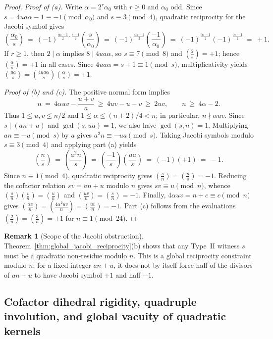 \documentclass[11pt, a4paper]{article}
\theoremstyle{plain}
\theoremstyle{definition}
\newtheorem{remark}[theorem]{Remark}
\newcommand{\leg}[2]{\left(\frac{#1}{#2}\right)}
\begin{document}
\begin{proof}
\emph{Proof of (a).} Write $\alpha=2^{r}\alpha_0$ with $r\ge0$ and $\alpha_0$ odd. Since $s=4ua\alpha-1\equiv-1\pmod{\alpha_0}$ and $s\equiv3\pmod 4$, quadratic reciprocity for the Jacobi symbol gives
$$\leg{\alpha_0}{s}\ =\ (-1)^{\frac{\alpha_0-1}{2}\cdot\frac{s-1}{2}}\leg{s}{\alpha_0}\ =\ (-1)^{\frac{\alpha_0-1}{2}}\leg{-1}{\alpha_0}\ =\ (-1)^{\frac{\alpha_0-1}{2}}(-1)^{\frac{\alpha_0-1}{2}}\ =\ +1.$$
If $r\ge1$, then $2\mid\alpha$ implies $8\mid 4ua\alpha$, so $s\equiv7\pmod 8$ and $\leg{2}{s}=+1$; hence $\leg{\alpha}{s}=+1$ in all cases. Since $4ua\alpha=s+1\equiv1\pmod s$, multiplicativity yields $\leg{ua}{s}=\leg{4ua\alpha}{s}\leg{\alpha}{s}=+1$.

\medskip\noindent\emph{Proof of (b) and (c).} The positive normal form implies
\[
n\ =\ 4\alpha uv-\frac{u+v}{a}\ \ge\ 4uv-u-v\ \ge\ 2uv,\qquad n\ \ge\ 4\alpha-2.
\]
Thus $1\le u,v\le n/2$ and $1\le\alpha\le(n+2)/4<n$; in particular, $n\nmid\alpha uv$. Since $s\mid(an+u)$ and $\gcd(s,ua)=1$, we also have $\gcd(s,n)=1$. Multiplying $an\equiv-u\pmod s$ by $a$ gives $a^{2}n\equiv-ua\pmod s$. Taking Jacobi symbols modulo $s\equiv3\pmod 4$ and applying part (a) yields
$$\leg{n}{s}\ =\ \leg{a^{2}n}{s}\ =\ \leg{-1}{s}\leg{ua}{s}\ =\ (-1)(+1)\ =\ -1.$$
Since $n\equiv1\pmod 4$, quadratic reciprocity gives $\leg{s}{n}=\leg{n}{s}=-1$. Reducing the cofactor relation $sv=an+u$ modulo $n$ gives $sv\equiv u\pmod n$, whence $\leg{s}{n}\leg{v}{n}=\leg{u}{n}$ and $\leg{uv}{n}=\leg{s}{n}=-1$. Finally, $4\alpha uv=n+c\equiv c\pmod n$ gives $\leg{\alpha c}{n}=\leg{4\alpha^{2}uv}{n}=\leg{uv}{n}=-1$. Part (c) follows from the evaluations $\leg{2}{n}=\leg{3}{n}=+1$ for $n\equiv1\pmod{24}$.
\end{proof}

\begin{remark}[Scope of the Jacobi obstruction]
Theorem~\ref{thm:global_jacobi_reciprocity}(b) shows that any Type~II witness $s$ must be a quadratic non-residue modulo $n$. This is a global reciprocity constraint modulo $n$; for a fixed integer $an+u$, it does not by itself force half of the divisors of $an+u$ to have Jacobi symbol $+1$ and half $-1$.
\end{remark}

\subsection{Cofactor dihedral rigidity, quadruple involution, and global vacuity of quadratic kernels}\label{subsec:dihedral_and_vacuity}
\end{document}
